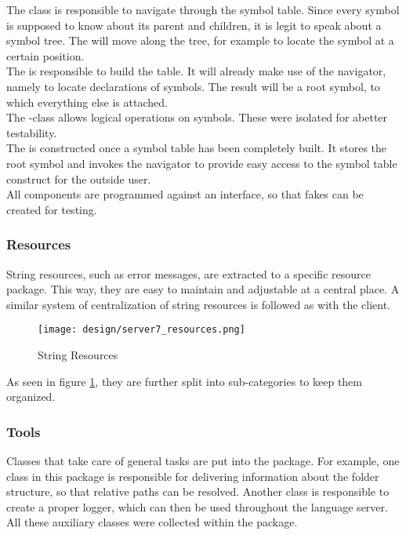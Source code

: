 The class  is responsible to navigate through the symbol table.
Since every symbol is supposed to know about its parent and children, it is legit to speak about a symbol tree.
The  will move along the tree, for example to locate the symbol at a certain position.\\

The  is responsible to build the table.
It will already make use of the navigator, namely to locate declarations of symbols.
The result will be a root symbol, to which everything else is attached.\\

The -class allows logical operations on symbols.
These were isolated for abetter testability.\\

The  is constructed once a symbol table has been completely built.
It stores the root symbol and invokes the navigator to provide easy access to the symbol table construct for the outside user.\\

All components are programmed against an interface, so that fakes can be created for testing.\\

\subsubsection{Resources}
String resources, such as error messages, are extracted to a specific resource package.
This way, they are easy to maintain and adjustable at a central place.
A similar system of centralization of string resources is followed as with the client.

\begin{figure}[H]
    \centering
    \texttt{[image: design/server7\_resources.png]}
    \caption{String Resources}
    \label{fig:server_resources}
\end{figure}

As seen in figure \ref{fig:server_resources}, they are further split into sub-categories to keep them organized.

\subsubsection{Tools}
Classes that take care of general tasks are put into the  package.
For example, one class in this package is responsible for delivering information about the folder structure, so that relative paths can be resolved.
Another class is responsible to create a proper logger, which can then be used throughout the language server.
All these auxiliary classes were collected within the  package.\\

